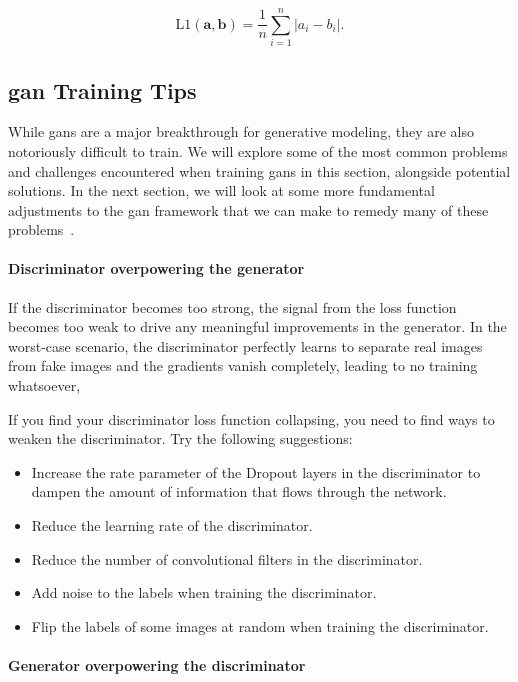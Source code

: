\[
	\mathrm{L1}(\mathbf{a},\mathbf{b}) = \frac{1}{n} \sum_{i=1}^n |a_i - b_i|
	.\]

\subsection{\gls{gan} Training Tips}

While \glspl{gan}  are a major breakthrough for generative modeling, they are also notoriously difficult to train.
We will explore some of the most common problems and challenges encountered when training \glspl{gan}  in this section, alongside potential solutions.
In the next section, we will look at some more fundamental adjustments to the \gls{gan} framework that we can make to remedy many of these problems~\cite{foster2022generative}.

\paragraph{Discriminator overpowering the generator}

If the discriminator becomes too strong, the signal from the loss function becomes too weak to drive any meaningful improvements in the generator.
In the worst-case scenario, the discriminator perfectly learns to separate real images from fake images and the gradients vanish completely, leading to no training whatsoever,

If you find your discriminator loss function collapsing, you need to find ways to weaken the discriminator. Try the following suggestions:

\begin{itemize}
	\item Increase the rate parameter of the Dropout layers in the discriminator to dampen the amount of information that flows through the network.
	\item Reduce the learning rate of the discriminator.
	\item Reduce the number of convolutional filters in the discriminator.
	\item Add noise to the labels when training the discriminator.
	\item Flip the labels of some images at random when training the discriminator.
\end{itemize}

\paragraph{Generator overpowering the discriminator}

